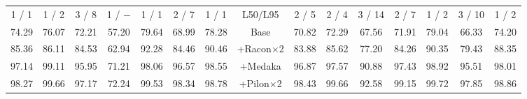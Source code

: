 \documentclass[a4paper,num-refs]{oup-contemporary}
\begin{document}
\begin{table}[t!]
\begin{tabular}{ccccccc|cc|ccccccc}
1 / 1   &       1 / 2   &       3 / 8   &       1 / $-$ &       1 / 1   &       2 / 7   &       1 / 1   &       \multicolumn{2}{c|}{L50/L95}    &       2 / 5   &       2 / 4   &       3 / 14  &       2 / 7   &       1 / 2   &       3 / 10  &       1 / 2\\
74.29   &       76.07   &       72.21   &       57.20   &       79.64   &       68.99   &       78.28   &       \multicolumn{2}{c|}{Base}       &       70.82   &       72.29   &       67.56   &       71.91   &       79.04   &       66.33   &       74.20\\
85.36   &       86.11   &       84.53   &       62.94   &       92.28   &       84.46   &       90.46   &       \multicolumn{2}{c|}{+Racon$\times$2}    &       83.88   &       85.62   &       77.20   &       84.26   &       90.35   &       79.43   &       88.35\\
97.14   &       99.11   &       95.95   &       71.21   &       98.06   &       96.57   &       98.55   &       \multicolumn{2}{c|}{+Medaka}    &       96.87   &       97.57   &       90.88   &       97.43   &       98.92   &       95.51   &       98.01\\
98.27   &       99.66   &       97.17   &       72.24   &       99.53   &       98.34   &       98.78   &       \multicolumn{2}{c|}{+Pilon$\times$2}    &       98.43   &       99.66   &       92.58   &       99.15   &       99.72   &       97.85   &       98.86\\
\midrule

\end{tabular}
\end{table}
\end{document}
